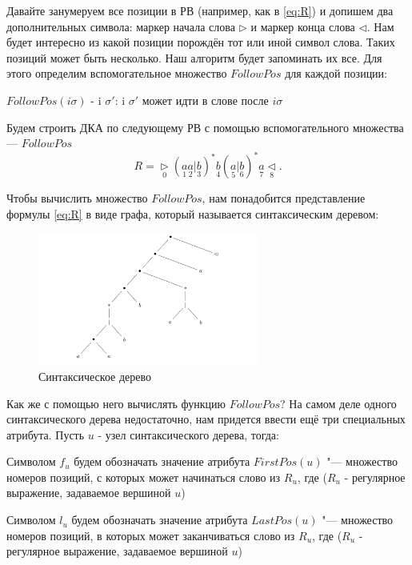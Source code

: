 Давайте занумеруем все позиции в РВ (например, как в \eqref{eq:R}) и допишем два дополнительных символа: маркер начала слова $\rhd$ и маркер конца слова $\lhd$. Нам будет интересно из какой позиции порождён тот или иной символ слова. Таких позиций может быть несколько. Наш алгоритм будет запоминать их все. Для этого определим вспомогательное множество $FollowPos$ для каждой позиции:
\begin{Def}
    $FollowPos(i \sigma)$ - {i $\sigma'$: i $\sigma'$ может идти в слове после $i\sigma$}
\end{Def}


Будем строить ДКА по следующему РВ с помощью вспомогательного множества --- $FollowPos$
\begin{equation}\label{eq:R}
    R = \underset{0}{\rhd}(\underset{1}{a}\underset{2}{a}|\underset{3}{b})^{*}\underset{4}{b}(\underset{5}{a}|\underset{6}{b})^{*}\underset{7}{a}\underset{8}{\lhd}.
\end{equation}

Чтобы вычислить множество $FollowPos$, нам понадобится представление формулы \ref{eq:R} в виде графа, который называется синтаксическим деревом:


\begin{figure}[h!tp]
    \centering
    \includegraphics[width = 275px]{images/SintTree.PNG}
    \caption{Синтаксическое дерево}
    \label{fig:SyntaxTree1}
\end{figure}

Как же с помощью него вычислять функцию $FollowPos$? На самом деле одного синтаксического дерева недостаточно, нам придется ввести ещё три специальных атрибута. Пусть $u$ - узел синтаксического дерева, тогда:
\begin{Def}Символом $f_{u}$ будем обозначать значение атрибута $FirstPos(u)$ "--- множество номеров позиций, с которых может начинаться слово из $R_u$, где ($R_u$ - регулярное выражение, задаваемое вершиной $u$) \end{Def}

\begin{Def}
    Символом $l_{u}$ будем обозначать значение атрибута $LastPos(u)$ "--- множество номеров позиций, в которых может заканчиваться слово из $R_u$, где ($R_u$ - регулярное выражение, задаваемое вершиной $u$)
\end{Def}

